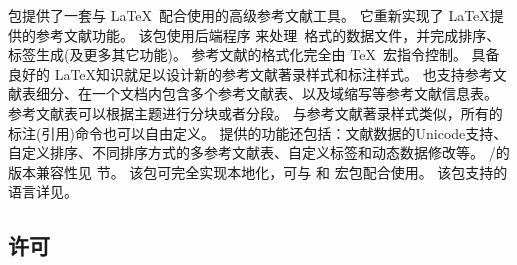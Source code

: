 
\biblatex 包提供了一套与 \LaTeX\ 配合使用的高级参考文献工具。
它重新实现了 \LaTeX 提供的参考文献功能。
该包使用后端程序 \biber 来处理\BibTeX\ 格式的数据文件，并完成排序、标签生成(及更多其它功能)。
参考文献的格式化完全由 \TeX\ 宏指令控制。
具备良好的 \LaTeX 知识就足以设计新的参考文献著录样式和标注样式。
\biblatex 也支持参考文献表细分、在一个文档内包含多个参考文献表、以及域缩写等参考文献信息表。
参考文献表可以根据主题进行分块或者分段。
与参考文献著录样式类似，所有的标注(引用)命令也可以自由定义。
提供的功能还包括：文献数据的Unicode支持、自定义排序、不同排序方式的多参考文献表、自定义标签和动态数据修改等。
\biber/\biblatex 的版本兼容性见  节。
该包可完全实现本地化，可与  和  宏包配合使用。
该包支持的语言详见。

\subsection{许可}

